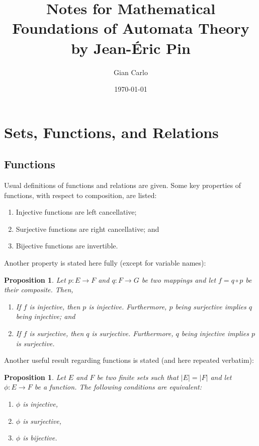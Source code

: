 \documentclass[11pt]{article}
\title{Notes for Mathematical Foundations of Automata Theory by Jean-Éric Pin}
\author{Gian Carlo}
\date{\today}
\theoremstyle{plain}
\newtheorem{freeprop}[definition]{Proposition}
\theoremstyle{nonumberplain}
\begin{document}
\maketitle

\section{Sets, Functions, and Relations}

\subsection{Functions}

Usual definitions of functions and relations are given. Some key properties of functions, with respect to composition, are listed:

\begin{enumerate}
    \item Injective functions are left cancellative;
    \item Surjective functions are right cancellative; and
    \item Bijective functions are invertible.
\end{enumerate}

Another property is stated here fully (except for variable names):

\begin{freeprop}
    Let $p : E \to F$ and $q : F \to G$ be two mappings and let $f = q \circ p$ be their composite. Then,
    \begin{enumerate}
        \item If $f$ is injective, then $p$ is injective. Furthermore, $p$ being surjective implies $q$ being injective; and
        \item If $f$ is surjective, then $q$ is surjective. Furthermore, $q$ being injective implies $p$ is surjective.
    \end{enumerate}
\end{freeprop}

Another useful result regarding functions is stated (and here repeated verbatim):

\begin{freeprop}
    Let $E$ and $F$ be two finite sets such that $|E| = |F|$ and let $\phi : E \to F$ be a function. The following conditions are equivalent: \begin{enumerate}
        \item $\phi$ is injective,
        \item $\phi$ is surjective,
        \item $\phi$ is bijective.
    \end{enumerate}
\end{freeprop}
\end{document}
